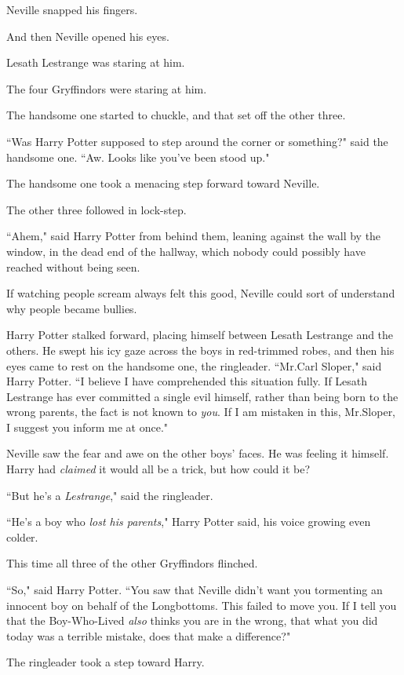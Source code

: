 Neville snapped his fingers.

And then Neville opened his eyes.

Lesath Lestrange was staring at him.

The four Gryffindors were staring at him.

The handsome one started to chuckle, and that set off the other three.

``Was Harry Potter supposed to step around the corner or something?" said the handsome one. ``Aw. Looks like you've been stood up."

The handsome one took a menacing step forward toward Neville.

The other three followed in lock-step.

``Ahem," said Harry Potter from behind them, leaning against the wall by the window, in the dead end of the hallway, which nobody could possibly have reached without being seen.

If watching people scream always felt this good, Neville could sort of understand why people became bullies.

Harry Potter stalked forward, placing himself between Lesath Lestrange and the others. He swept his icy gaze across the boys in red-trimmed robes, and then his eyes came to rest on the handsome one, the ringleader. ``Mr.\?Carl Sloper," said Harry Potter. ``I believe I have comprehended this situation fully. If Lesath Lestrange has ever committed a single evil himself, rather than being born to the wrong parents, the fact is not known to \emph{you}. If I am mistaken in this, Mr.\?Sloper, I suggest you inform me at once."

Neville saw the fear and awe on the other boys' faces. He was feeling it himself. Harry had \emph{claimed} it would all be a trick, but how could it be?

``But he's a \emph{Lestrange}," said the ringleader.

``He's a boy who \emph{lost his parents}," Harry Potter said, his voice growing even colder.

This time all three of the other Gryffindors flinched.

``So," said Harry Potter. ``You saw that Neville didn't want you tormenting an innocent boy on behalf of the Longbottoms. This failed to move you. If I tell you that the Boy-Who-Lived \emph{also} thinks you are in the wrong, that what you did today was a terrible mistake, does that make a difference?"

The ringleader took a step toward Harry.

